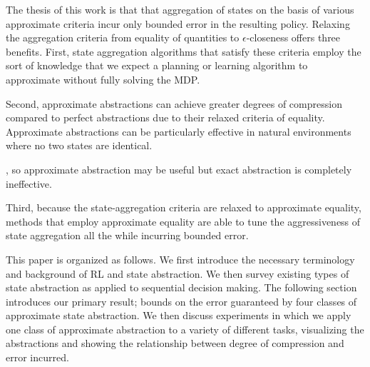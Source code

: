 The thesis of this work is that that aggregation of states on the basis of various approximate criteria incur only bounded error in the resulting policy. Relaxing the aggregation criteria from equality of quantities to $\epsilon$-closeness offers three benefits. First, state aggregation algorithms that satisfy these criteria employ the sort of knowledge that we expect a planning or learning algorithm to approximate without fully solving the \ac{MDP}. 

Second, approximate abstractions can achieve greater degrees of compression compared to perfect abstractions due to their relaxed criteria of equality. Approximate abstractions can be particularly effective in natural environments where no two states are identical.

, so approximate abstraction may be useful but exact abstraction is completely ineffective.


Third, because the state-aggregation criteria are relaxed to approximate equality, methods that employ approximate equality are able to tune the aggressiveness of state aggregation all the while incurring bounded error.


This paper is organized as follows. We first introduce the necessary terminology and background of \ac{RL} and state abstraction. We then survey existing types of state abstraction as applied to sequential decision making. The following section introduces our primary result; bounds on the error guaranteed by four classes of approximate state abstraction. We then discuss experiments in which we apply one class of approximate abstraction to a variety of different tasks, visualizing the abstractions and showing the relationship between degree of compression and error incurred.
